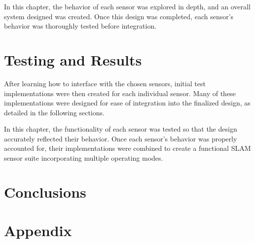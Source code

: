 \documentclass[12pt]{article}
\begin{document}
\par
In this chapter, the behavior of each sensor was explored in depth, and an overall system designed was created. Once this design was completed, each sensor's behavior was thoroughly tested before integration.

\newpage 
\section{Testing and Results}
After learning how to interface with the chosen sensors, initial test implementations were then created for each individual sensor. Many of these implementations were designed for ease of integration into the finalized design, as detailed in the following sections.







\par
In this chapter, the functionality of each sensor was tested so that the design accurately reflected their behavior. Once each sensor's behavior was properly accounted for, their implementations were combined to create a functional SLAM sensor suite incorporating multiple operating modes.

\newpage 
\section{Conclusions}


\newpage
\singlespacing
\doublespacing
\newpage

\section*{Appendix} %
\setcounter{subsection}{0}
\renewcommand\thesubsection{\Alph{subsection}}
\renewcommand\thesubsubsection{\thesubsection.\roman{subsubsection}}

\newpage

\newpage

%
%
%
%

\end{document}
